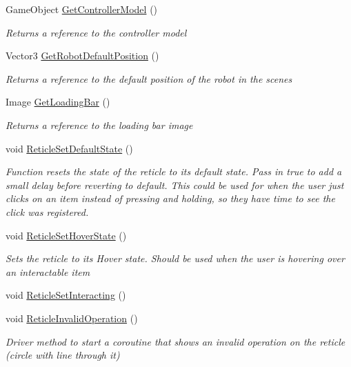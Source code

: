 \begin{DoxyCompactItemize}
Game\+Object \mbox{\hyperlink{class_intro_session_manager_a836a60ce3ae8f1fb514c81f3c59da3ad}{Get\+Controller\+Model}} ()
\begin{DoxyCompactList}\small\item\em Returns a reference to the controller model \end{DoxyCompactList}\item 
Vector3 \mbox{\hyperlink{class_intro_session_manager_ab271ab8ae6b7e13929f05fd55670dc3f}{Get\+Robot\+Default\+Position}} ()
\begin{DoxyCompactList}\small\item\em Returns a reference to the default position of the robot in the scenes \end{DoxyCompactList}\item 
Image \mbox{\hyperlink{class_intro_session_manager_a918fbca0cbe7a7769c8a777e059f1375}{Get\+Loading\+Bar}} ()
\begin{DoxyCompactList}\small\item\em Returns a reference to the loading bar image \end{DoxyCompactList}\item 
void \mbox{\hyperlink{class_intro_session_manager_a2c3b7ee11852a65be6fb794c84de14f5}{Reticle\+Set\+Default\+State}} ()
\begin{DoxyCompactList}\small\item\em Function resets the state of the reticle to its default state. Pass in true to add a small delay before reverting to default. This could be used for when the user just clicks on an item instead of pressing and holding, so they have time to see the click was registered. \end{DoxyCompactList}\item 
void \mbox{\hyperlink{class_intro_session_manager_a31072153b257d37a5b1cd1566dd45d16}{Reticle\+Set\+Hover\+State}} ()
\begin{DoxyCompactList}\small\item\em Sets the reticle to its Hover state. Should be used when the user is hovering over an interactable item \end{DoxyCompactList}\item 
void \mbox{\hyperlink{class_intro_session_manager_aed37fcae779d3784743969ae0739c1c3}{Reticle\+Set\+Interacting}} ()
\item 
void \mbox{\hyperlink{class_intro_session_manager_a7ecdbb5df14f9c17bd6556467916f4aa}{Reticle\+Invalid\+Operation}} ()
\begin{DoxyCompactList}\small\item\em Driver method to start a coroutine that shows an invalid operation on the reticle (circle with line through it) \end{DoxyCompactList}\end{DoxyCompactItemize}
